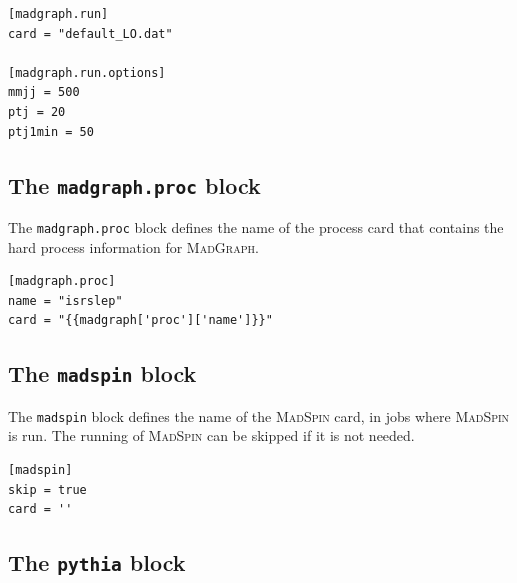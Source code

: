 \documentclass{article}
\newcommand{\madgraph}{\textsc{MadGraph}}
\newcommand{\madspin}{\textsc{MadSpin}}
\newcommand{\toml}{\textsc{toml}}
\begin{document}
\begin{listing}[H]
	\begin{verbatim}
[madgraph.run]
card = "default_LO.dat"

[madgraph.run.options]
mmjj = 500
ptj = 20
ptj1min = 50
        \end{verbatim}
	\caption{The \texttt{madgraph.run} blocks of an example \toml{} configuration file for generating slepton events.}
	\label{slepton-config-run}
\end{listing}


\subsection{The \texttt{madgraph.proc} block}
\label{ssec:the-madgraph-proc-block}

The \texttt{madgraph.proc} block defines the name of the process card that contains the hard process information for \madgraph.

\begin{listing}[H]
	\begin{verbatim}
[madgraph.proc]
name = "isrslep"
card = "{{madgraph['proc']['name']}}"
  \end{verbatim}
	\caption{The \texttt{madgraph.proc} block of an example full \toml{} configuration file for generating slepton events.}
	\label{slepton-config-proc}
\end{listing}

\subsection{The \texttt{madspin} block}
\label{ssec:the-madspin-block}

The \texttt{madspin} block defines the name of the \madspin{} card, in jobs where \madspin{} is run.  The running of \madspin{} can be skipped if it is not needed.

\begin{listing}[H]
	\begin{verbatim}
[madspin]
skip = true
card = ''
        \end{verbatim}
	\caption{The \texttt{madgraph.run} block of an example \toml{} configuration file for generating slepton events.}
	\label{slepton-config-madpsin}
\end{listing}

\subsection{The \texttt{pythia} block}
\label{ssec:the-pythia-block}
\end{document}
